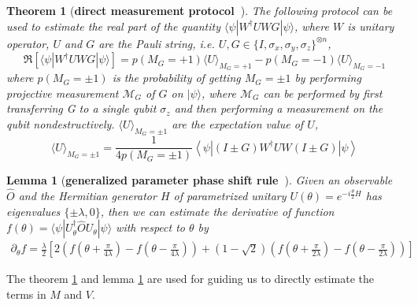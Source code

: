 \documentclass[twocolumn,
pra,aps,superscriptaddress,showpacs,amsmath,amssymb]{revtex4-2}
\newtheorem{theorem}{Theorem}
\newtheorem{lemma}{Lemma}
\begin{document}

\begin{theorem}[\bf{direct measurement protocol}~\cite{mitarai2019methodology}]\label{thm:measure}
The following protocol can be used to estimate the real part of the quantity $\langle\psi|W^\dagger UWG|\psi\rangle$, where $W$ is unitary operator, $U$ and $G$ are the Pauli string, i.e. $U,G\in \{I,\sigma_x, \sigma_y, \sigma_z\}^{\otimes n}$, 
\begin{equation}
\Re[\langle\psi|W^\dagger UWG|\psi\rangle] = p(M_G=+1)\langle U\rangle_{M_G=+1}-p(M_G=-1)\langle U\rangle_{M_G=-1}
\end{equation}
where $p(M_G=\pm 1)$ is the probability of getting $M_G=\pm 1$ by performing projective measurement $\mathcal{M}_G$ of $G$ on $|\psi\rangle$, where $\mathcal{M}_G$ can be performed by first transferring G to a single qubit $\sigma_z$ and then performing a measurement on the qubit nondestructively. $\langle U\rangle_{M_G=\pm 1}$ are the expectation value of $U$,
\begin{equation}
\langle U\rangle_{M_G=\pm1}=\frac1{4p(M_G=\pm1)}\left\langle\psi|(I\pm G)W^\dagger UW(I\pm G)|\psi\right\rangle 
\end{equation}
\end{theorem}

\begin{lemma}[\bf{generalized parameter phase shift rule}~\cite{wierichs2022general}]
\label{lemma:phase_shift_rule}
Given an observable $\hat{O}$ and the Hermitian generator $H$ of parametrized unitary $U(\theta)=e^{-i\frac{\theta}{2}H}$ has eigenvalues $\{\pm \lambda, 0\}$, then we can estimate the derivative of function $f(\theta)=\langle \psi|U^\dagger_{\theta}\hat{O}U_{\theta}|\psi\rangle$ with respect to $\theta$ by
\begin{align}
\partial_{\theta}f = \frac{\lambda}{2}\left[2\left(f(\theta + \frac{\pi}{4\lambda}) - f(\theta - \frac{\pi}{4\lambda} )\right) +(1-\sqrt{2})\left(f(\theta+\frac{\pi}{2\lambda}) - f(\theta-\frac{\pi}{2\lambda})\right)\right]
\end{align}
\end{lemma}

The theorem \ref{thm:measure} and lemma \ref{lemma:phase_shift_rule} are used for guiding us to directly estimate the terms in $M$ and $V$.
\end{document}
